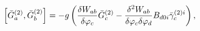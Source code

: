 \begin{equation}
\left[ \bar{G}_{a}^{(2)},\bar{G}_{b}^{(2)}\right] =-g\left( \frac{\delta
W_{ab}}{\delta \varphi _{c}}\bar{G}_{c}^{(2)}-\frac{\delta ^{2}W_{ab}}{%
\delta \varphi _{c}\delta \varphi _{d}}B_{d0i}\bar{\gamma}_{c}^{(2)i}\right)
,  \label{i9}
\end{equation}

